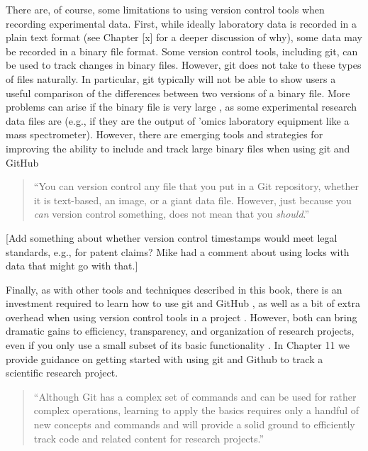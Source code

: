\documentclass[]{tufte-book}
\begin{document}
There are, of course, some limitations to using version control tools when
recording experimental data. First, while ideally laboratory data is recorded in
a plain text format (see Chapter {[}x{]} for a deeper discussion of why), some data
may be recorded in a binary file format. Some version control tools, including
git, can be used to track changes in binary files. However, git does not take to
these types of files naturally. In particular, git typically will not be able to
show users a useful comparison of the differences between two versions of a
binary file. More problems can arise if the binary file is very large
\citep{perez2016ten, blischak2016quick}, as some experimental research data files
are (e.g., if they are the output of 'omics laboratory equipment like a mass
spectrometer). However, there are emerging tools and strategies for improving
the ability to include and track large binary files when using git and GitHub
\citep{blischak2016quick}

\begin{quote}
``You can version control any file that you put in a Git repository, whether it is
text-based, an image, or a giant data file. However, just because you \emph{can} version
control something, does not mean that you \emph{should}.'' \citep{blischak2016quick}
\end{quote}

{[}Add something about whether version control timestamps would meet legal standards,
e.g., for patent claims? Mike had a comment about using locks with data that might
go with that.{]}

Finally, as with other tools and techniques described in this book, there is an
investment required to learn how to use git and GitHub \citep{perez2016ten}, as well
as a bit of extra overhead when using version control tools in a project
\citep{raymond2003art}. However, both can bring dramatic gains to efficiency,
transparency, and organization of research projects, even if you only use a
small subset of its basic functionality \citep{perez2016ten}. In Chapter 11 we
provide guidance on getting started with using git and Github to track a
scientific research project.

\begin{quote}
``Although Git has a complex set of commands and can be used for rather complex
operations, learning to apply the basics requires only a handful of new concepts
and commands and will provide a solid ground to efficiently track code and related
content for research projects.'' \citep{perez2016ten}
\end{quote}
\end{document}
